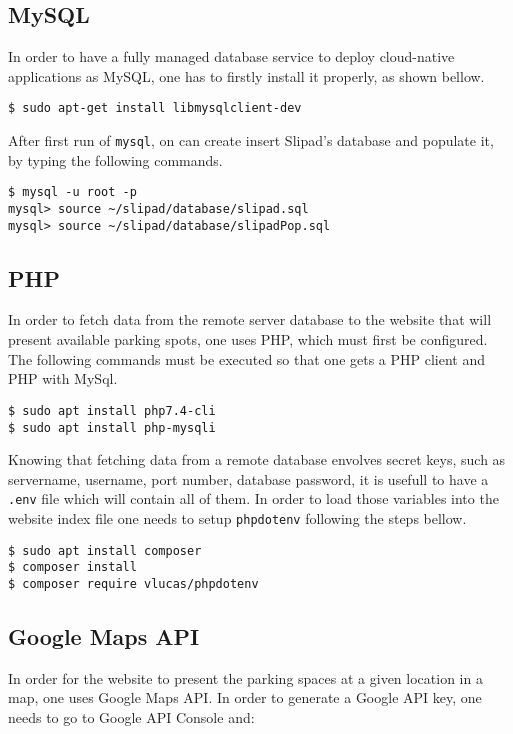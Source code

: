 \subsection{MySQL}
In order to have a fully managed database service to deploy cloud-native applications as MySQL, one has to firstly install it properly, as shown bellow.

\begin{lstlisting}
$ sudo apt-get install libmysqlclient-dev
\end{lstlisting}

After first run of \verb|mysql|, on can create insert Slipad's database and populate it, by typing the following commands.
\begin{lstlisting}
$ mysql -u root -p
mysql> source ~/slipad/database/slipad.sql
mysql> source ~/slipad/database/slipadPop.sql
\end{lstlisting}

\subsection{PHP}
In order to fetch data from the remote server database to the website that will present available parking spots, one uses PHP, which must first be configured. The following commands must be executed so that one gets a PHP client and PHP with MySql.

\begin{lstlisting}
$ sudo apt install php7.4-cli
$ sudo apt install php-mysqli
\end{lstlisting}

Knowing that fetching data from a remote database envolves secret keys, such as servername, username, port number, database password, it is usefull to have a \verb|.env| file which will contain all of them. In order to load those variables into the website index file one needs to setup \verb|phpdotenv| following the steps bellow. \cite{phpdotenv}

\begin{lstlisting}
$ sudo apt install composer
$ composer install
$ composer require vlucas/phpdotenv
\end{lstlisting}

\subsection{Google Maps API}
In order for the website to present the parking spaces at a given location in a map, one uses Google Maps API. In order to generate a Google API key, one needs to go to Google API Console \cite{googleapi} and:

